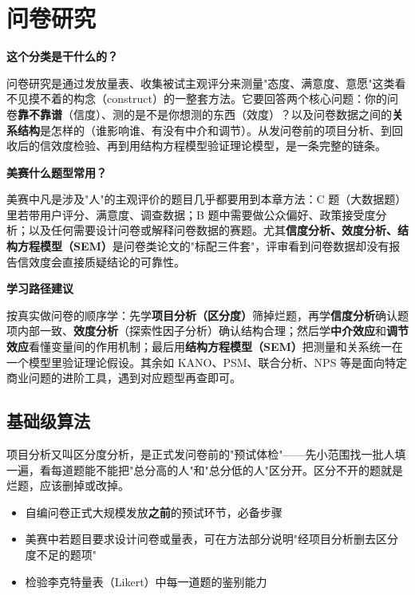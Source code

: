 \chapter{问卷研究}

\begin{chapteroverview}
\textbf{这个分类是干什么的？}

问卷研究是通过发放量表、收集被试主观评分来测量"态度、满意度、意愿"这类看不见摸不着的构念（construct）的一整套方法。它要回答两个核心问题：你的问卷\textbf{靠不靠谱}（信度）、测的是不是你想测的东西（效度）？以及问卷数据之间的\textbf{关系结构}是怎样的（谁影响谁、有没有中介和调节）。从发问卷前的项目分析、到回收后的信效度检验、再到用结构方程模型验证理论模型，是一条完整的链条。

\textbf{美赛什么题型常用？}

美赛中凡是涉及"人"的主观评价的题目几乎都要用到本章方法：C 题（大数据题）里若带用户评分、满意度、调查数据；B 题中需要做公众偏好、政策接受度分析；以及任何需要设计问卷或解释问卷数据的赛题。尤其\textbf{信度分析、效度分析、结构方程模型（SEM）}是问卷类论文的"标配三件套"，评审看到问卷数据却没有报告信效度会直接质疑结论的可靠性。

\textbf{学习路径建议}

按真实做问卷的顺序学：先学\textbf{项目分析（区分度）}筛掉烂题，再学\textbf{信度分析}确认题项内部一致、\textbf{效度分析}（探索性因子分析）确认结构合理；然后学\textbf{中介效应}和\textbf{调节效应}看懂变量间的作用机制；最后用\textbf{结构方程模型（SEM）}把测量和关系统一在一个模型里验证理论假设。其余如 KANO、PSM、联合分析、NPS 等是面向特定商业问题的进阶工具，遇到对应题型再查即可。
\end{chapteroverview}

\section{基础级算法}


\begin{algointro}
项目分析又叫区分度分析，是正式发问卷前的"预试体检"——先小范围找一批人填一遍，看每道题能不能把"总分高的人"和"总分低的人"区分开。区分不开的题就是烂题，应该删掉或改掉。
\end{algointro}

\begin{algoscene}
\begin{itemize}
    \item 自编问卷正式大规模发放\textbf{之前}的预试环节，必备步骤
    \item 美赛中若题目要求设计问卷或量表，可在方法部分说明"经项目分析删去区分度不足的题项"
    \item 检验李克特量表（Likert）中每一道题的鉴别能力
\end{itemize}
\end{algoscene}

